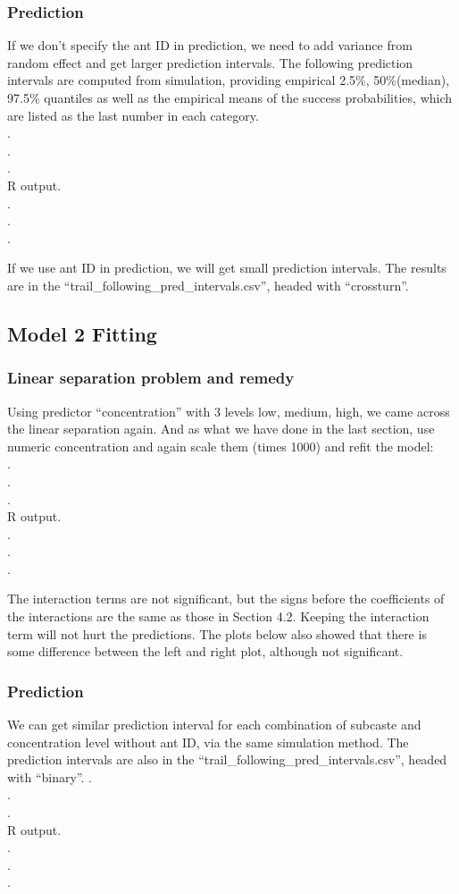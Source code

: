 \documentclass{article}
\begin{document}
		\subsubsection{Prediction}
		If we don’t specify the ant ID in prediction, we need to add variance from random effect and get larger prediction intervals. The following prediction intervals are computed from simulation, providing empirical 2.5\%, 50\%(median), 97.5\% quantiles as well as the empirical means of the success probabilities, which are listed as the last number in each category.\\
		.\\
		.\\
		.\\
		R output.\\
		.\\
		.\\
		.	
		
		If we use ant ID in prediction, we will get small prediction intervals. The results are in the “trail\_following\_pred\_intervals.csv”, headed with “crossturn”.
	\subsection{Model 2 Fitting}
	\subsubsection{Linear separation problem and remedy}
	Using predictor “concentration” with 3 levels low, medium, high, we came across the linear separation again. And as what we have done in the last section, use numeric concentration and again scale them (times 1000) and refit the model:\\
	.\\
	.\\
	.\\
	R output.\\
	.\\
	.\\
	.		
	
	The interaction terms are not significant, but the signs before the coefficients of the interactions are the same as those in Section 4.2. Keeping the interaction term will not hurt the predictions. The plots below also showed that there is some difference between the left and right plot, although not significant.
	\subsubsection{Prediction}
	We can get similar prediction interval for each combination of subcaste and concentration level without ant ID, via the same simulation method. The prediction intervals are also in the “trail\_following\_pred\_intervals.csv”, headed with “binary”.
	.\\
	.\\
	.\\
	R output.\\
	.\\
	.\\
	.		
	
\end{document}
